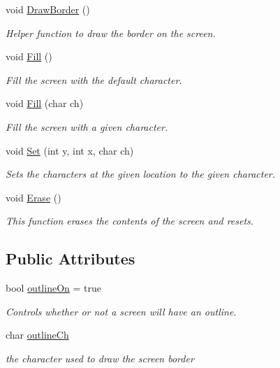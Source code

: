 \begin{DoxyCompactItemize}
\item 
void \hyperlink{classScreen_a146a94183c6c610ae8a619521fc9d102}{Draw\-Border} ()
\begin{DoxyCompactList}\small\item\em Helper function to draw the border on the screen. \end{DoxyCompactList}\item 
void \hyperlink{classScreen_a8cf89892a333f7d6e7227ffdf77b3351}{Fill} ()
\begin{DoxyCompactList}\small\item\em Fill the screen with the default character. \end{DoxyCompactList}\item 
void \hyperlink{classScreen_aeeebb297b5f39c2b25ee026df8fec9ac}{Fill} (char ch)
\begin{DoxyCompactList}\small\item\em Fill the screen with a given character. \end{DoxyCompactList}\item 
void \hyperlink{classScreen_ab035671163a5cabee7611c7c456b1c56}{Set} (int y, int x, char ch)
\begin{DoxyCompactList}\small\item\em Sets the characters at the given location to the given character. \end{DoxyCompactList}\item 
void \hyperlink{classScreen_a7e2c21a6e63390eb3d8b46ee85af05d2}{Erase} ()
\begin{DoxyCompactList}\small\item\em This function erases the contents of the screen and resets. \end{DoxyCompactList}\end{DoxyCompactItemize}
\subsection*{Public Attributes}
\begin{DoxyCompactItemize}
\item 
bool \hyperlink{classScreen_a6f906b745f406576d9f7aeaec330c9d6}{outline\-On} = true
\begin{DoxyCompactList}\small\item\em Controls whether or not a screen will have an outline. \end{DoxyCompactList}\item 
char \hyperlink{classScreen_a0b59df2bfafff7a121286a5ea40503b6}{outline\-Ch}
\begin{DoxyCompactList}\small\item\em the character used to draw the screen border \end{DoxyCompactList}\end{DoxyCompactItemize}
